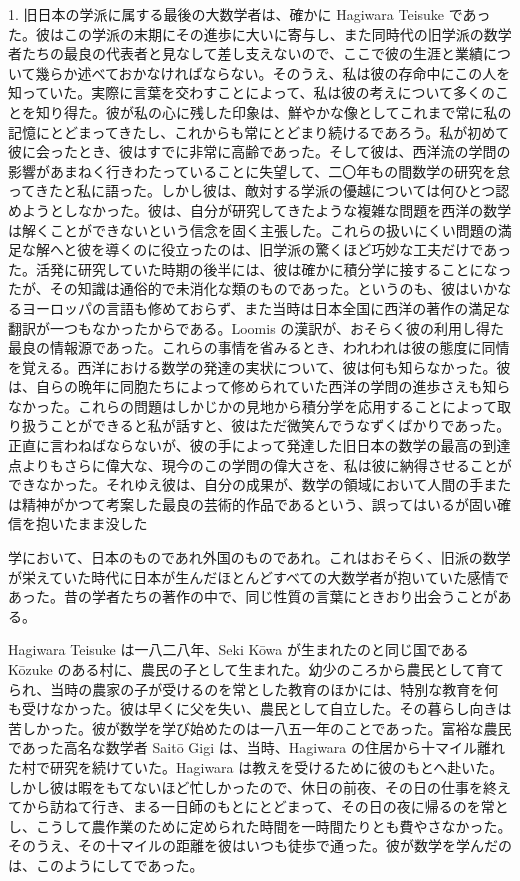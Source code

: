 \documentclass[11pt]{article}
\newcommand{\scanpage}[2]{\clearpage\setcounter{footnote}{0}\noindent{\footnotesize\color{gray}PDF #1 頁 · #2}\par\medskip}
\begin{document}
1. 旧日本の学派に属する最後の大数学者は、確かに Hagiwara Teisuke であった。彼はこの学派の末期にその進歩に大いに寄与し、また同時代の旧学派の数学者たちの最良の代表者と見なして差し支えないので、ここで彼の生涯と業績について幾らか述べておかなければならない。そのうえ、私は彼の存命中にこの人を知っていた。実際に言葉を交わすことによって、私は彼の考えについて多くのことを知り得た。彼が私の心に残した印象は、鮮やかな像としてこれまで常に私の記憶にとどまってきたし、これからも常にとどまり続けるであろう。私が初めて彼に会ったとき、彼はすでに非常に高齢であった。そして彼は、西洋流の学問の影響があまねく行きわたっていることに失望して、二〇年もの間数学の研究を怠ってきたと私に語った。しかし彼は、敵対する学派の優越については何ひとつ認めようとしなかった。彼は、自分が研究してきたような複雑な問題を西洋の数学は解くことができないという信念を固く主張した。これらの扱いにくい問題の満足な解へと彼を導くのに役立ったのは、旧学派の驚くほど巧妙な工夫だけであった。活発に研究していた時期の後半には、彼は確かに積分学に接することになったが、その知識は通俗的で未消化な類のものであった。というのも、彼はいかなるヨーロッパの言語も修めておらず、また当時は日本全国に西洋の著作の満足な翻訳が一つもなかったからである。Loomis の漢訳が、おそらく彼の利用し得た最良の情報源であった。これらの事情を省みるとき、われわれは彼の態度に同情を覚える。西洋における数学の発達の実状について、彼は何も知らなかった。彼は、自らの晩年に同胞たちによって修められていた西洋の学問の進歩さえも知らなかった。これらの問題はしかじかの見地から積分学を応用することによって取り扱うことができると私が話すと、彼はただ微笑んでうなずくばかりであった。正直に言わねばならないが、彼の手によって発達した旧日本の数学の最高の到達点よりもさらに偉大な、現今のこの学問の偉大さを、私は彼に納得させることができなかった。それゆえ彼は、自分の成果が、数学の領域において人間の手または精神がかつて考案した最良の芸術的作品であるという、誤ってはいるが固い確信を抱いたまま没した

\scanpage{0316}{印刷頁 302 (top left)}
\noindent 学において、日本のものであれ外国のものであれ。これはおそらく、旧派の数学が栄えていた時代に日本が生んだほとんどすべての大数学者が抱いていた感情であった。昔の学者たちの著作の中で、同じ性質の言葉にときおり出会うことがある。

Hagiwara Teisuke は一八二八年、Seki Kōwa が生まれたのと同じ国である Kōzuke のある村に、農民の子として生まれた。幼少のころから農民として育てられ、当時の農家の子が受けるのを常とした教育のほかには、特別な教育を何も受けなかった。彼は早くに父を失い、農民として自立した。その暮らし向きは苦しかった。彼が数学を学び始めたのは一八五一年のことであった。富裕な農民であった高名な数学者 Saitō Gigi は、当時、Hagiwara の住居から十マイル離れた村で研究を続けていた。Hagiwara は教えを受けるために彼のもとへ赴いた。しかし彼は暇をもてないほど忙しかったので、休日の前夜、その日の仕事を終えてから訪ねて行き、まる一日師のもとにとどまって、その日の夜に帰るのを常とし、こうして農作業のために定められた時間を一時間たりとも費やさなかった。そのうえ、その十マイルの距離を彼はいつも徒歩で通った。彼が数学を学んだのは、このようにしてであった。
\end{document}
